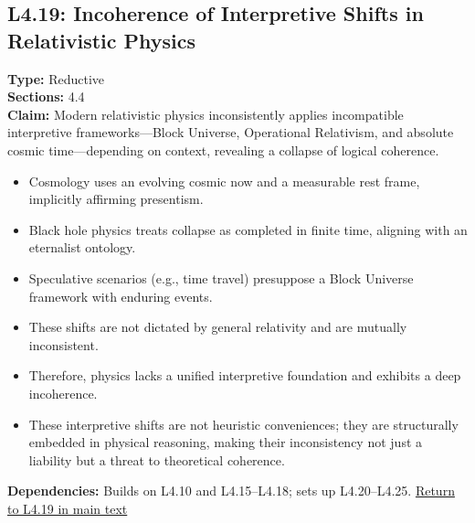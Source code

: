 \documentclass[12pt]{book}
\newcommand{\returnlink}[1]{\hyperref[logic:#1]{Return to #1 in main text}\xspace}
\begin{document}
\subsection*{L4.19: Incoherence of Interpretive Shifts in Relativistic Physics}
\label{appendix:L4.19}
\textbf{Type:} Reductive \\
\textbf{Sections:} 4.4 \\
\textbf{Claim:} Modern relativistic physics inconsistently applies incompatible interpretive frameworks---Block Universe, Operational Relativism, and absolute cosmic time---depending on context, revealing a collapse of logical coherence.
\begin{itemize}
  \item Cosmology uses an evolving cosmic now and a measurable rest frame, implicitly affirming presentism.
  \item Black hole physics treats collapse as completed in finite time, aligning with an eternalist ontology.
  \item Speculative scenarios (e.g., time travel) presuppose a Block Universe framework with enduring events.
  \item These shifts are not dictated by general relativity and are mutually inconsistent.
  \item Therefore, physics lacks a unified interpretive foundation and exhibits a deep incoherence.
  \item These interpretive shifts are not heuristic conveniences; they are structurally embedded in physical reasoning, making their inconsistency not just a liability but a threat to theoretical coherence.
\end{itemize}
\textbf{Dependencies:} Builds on L4.10 and L4.15–L4.18; sets up L4.20–L4.25.
\returnlink{L4.19}
\end{document}
